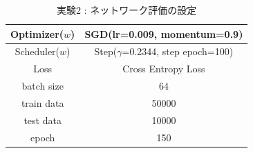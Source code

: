 \begin{table}[t]
  \begin{center}
    \caption{実験2 : ネットワーク評価の設定}
  	\vspace{3mm}
    \begin{tabular}{|c|c|} \hline
      Optimizer($w$) & SGD(lr=0.009, momentum=0.9) \\ \hline
      Scheduler($w$) & Step($\gamma$=0.2344, step epoch=100) \\ \hline
      Loss & Cross Entropy Loss \\ \hline
      batch size & 64 \\ \hline
      train data & 50000\\ \hline
      test data &  10000\\ \hline
      epoch & 150\\ \hline
    \end{tabular}
    \label{tab:setting_eval}
  \end{center}
\end{table}
